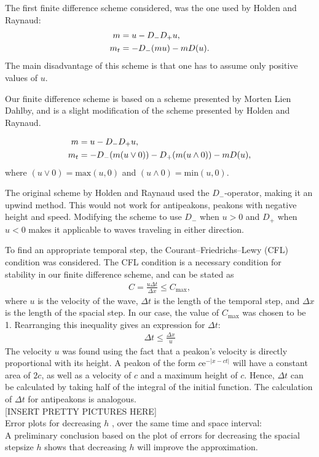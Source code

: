 The first finite difference scheme considered, was the one used by Holden and Raynaud: \cite{holden2006convergence}
\begin{align}
m &= u - D_{-}D_{+}u, \notag \\ 
m_t &= -D_{-}(mu) - mD(u).
\end{align}
The main disadvantage of this scheme is that one has to assume only positive values of $u$.

Our finite difference scheme is based on a scheme presented by Morten Lien Dahlby\cite{dahlby2007geometric}, and is a slight modification of the scheme presented by Holden and Raynaud.

\begin{align}
m &= u - D_{-}D_{+}u, \notag \\
m_t &= -D_{-}(m(u \vee 0)) -D_{+}(m(u \wedge 0)) - mD(u),
\end{align}
where $(u \vee 0) = \text{max}(u,0)$ and $(u \wedge 0) = \text{min}(u,0)$.

The original scheme by Holden and Raynaud used the $D_{-}$-operator, making it an upwind method. This would not work for antipeakons, peakons with negative height and speed. Modifying the scheme to use  $D_{-}$ when $u > 0$ and $D_{+}$ when $ u < 0$ makes it applicable to waves traveling in either direction. 

To find an appropriate temporal step, the Courant–Friedrichs–Lewy (CFL) condition was considered. The CFL condition is a necessary condition for stability in our finite difference scheme, and can be stated as
\begin{align}
C = \frac{u\Delta t}{\Delta x} \leq C_{\text{max}},
\end{align}
where $u$ is the velocity of the wave, $\Delta t$ is the length of the temporal step, and $\Delta x$ is the length of the spacial step. In our case, the value of $C_{\text{max}}$ was chosen to be 1. Rearranging this inequality gives an expression for $\Delta t$:
\begin{align}
\Delta t \leq \frac{\Delta x}{u}
\end{align}
The velocity $u$ was found using the fact that a peakon's velocity is directly proportional with its height. A peakon of the form $c\text{e}^{-|x-ct|}$ will have a constant area of $2c$, as well as a velocity of $c$ and a maximum height of $c$. Hence, $\Delta t$ can be calculated by taking half of the integral of the initial function. The calculation of $\Delta t$ for antipeakons is analogous. \\

[INSERT PRETTY PICTURES HERE]\\

Error plots for decreasing $h$ , over the same time and space interval:\\
A preliminary conclusion based on the plot of errors for decreasing the spacial stepsize $h$ shows that decreasing $h$ will improve the approximation.


